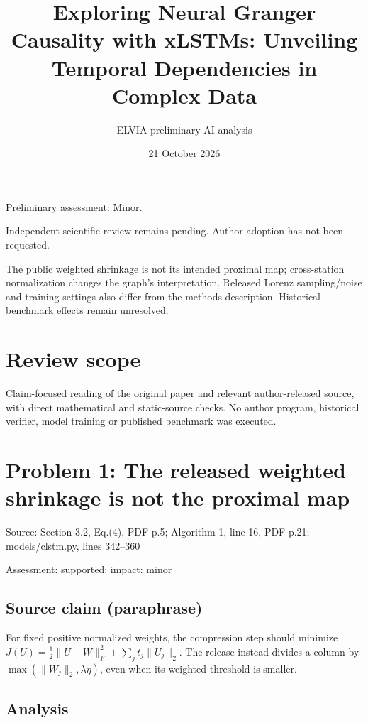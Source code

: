 \documentclass[11pt]{article}
\begin{document}
\title{Exploring Neural Granger Causality with xLSTMs: Unveiling Temporal Dependencies in Complex Data}

\author{ELVIA preliminary AI analysis}\date{21 October 2026}\maketitle

Preliminary assessment: Minor.\par

Independent scientific review remains pending. Author adoption has not been requested.

The public weighted shrinkage is not its intended proximal map; cross-station normalization changes the graph’s interpretation. Released Lorenz sampling/noise and training settings also differ from the methods description. Historical benchmark effects remain unresolved.

\section*{Review scope}

Claim-focused reading of the original paper and relevant author-released source, with direct mathematical and static-source checks. No author program, historical verifier, model training or published benchmark was executed.

\section*{Problem 1: The released weighted shrinkage is not the proximal map}

Source: Section 3.2, Eq.(4), PDF p.5; Algorithm 1, line 16, PDF p.21; models/clstm.py, lines 342–360

Assessment: supported; impact: minor

\subsection*{Source claim (paraphrase)}

For fixed positive normalized weights, the compression step should minimize \(J(U)=\tfrac12\|U-W\|_F^2+\sum_jt_j\|U_j\|_2\). The release instead divides a column by \(\max(\|W_j\|_2,\lambda\eta)\), even when its weighted threshold is smaller.

\subsection*{Analysis}
\end{document}
